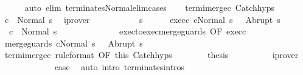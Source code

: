 \begin{isabellebody}
\ \ \ \ \isamarkupfalse%
\ {\isacharparenleft}auto\ elim{\isacharcolon}\ terminates{\isacharunderscore}Normal{\isacharunderscore}elim{\isacharunderscore}cases{\isacharparenright}\isanewline
\ \ \isamarkupfalse%
\ termi{\isacharunderscore}merge{\isacharunderscore}c{}\ Catch{\isachardot}hyps\isanewline
\ \ \isamarkupfalse%
\ {\isachardoublequoteopen}{\isasymGamma}{\isasymturnstile}c{}\ {\isasymdown}\ Normal\ s{\isachardoublequoteclose}\ \isamarkupfalse%
\ iprover\isanewline
\ \ \isamarkupfalse%
\isanewline
\ \ \isacommand{{\isacharbraceleft}}\isamarkupfalse%
\isanewline
\ \ \ \ \isamarkupfalse%
\ s{\isacharprime}\isanewline
\ \ \ \ \isamarkupfalse%
\ exec{\isacharunderscore}c{}{\isacharcolon}\ {\isachardoublequoteopen}{\isasymGamma}{\isasymturnstile}{\isasymlangle}c{}{\isacharcomma}Normal\ s\ {\isasymrangle}\ {\isasymRightarrow}\ Abrupt\ s{\isacharprime}{\isachardoublequoteclose}\isanewline
\ \ \ \ \isamarkupfalse%
\ {\isachardoublequoteopen}{\isasymGamma}{\isasymturnstile}\ c{}\ {\isasymdown}\ Normal\ s{\isacharprime}{\isachardoublequoteclose}\isanewline
\ \ \ \ \isamarkupfalse%
\ {\isacharminus}\isanewline
\ \ \ \ \ \ \isamarkupfalse%
\ exec{\isacharunderscore}to{\isacharunderscore}exec{\isacharunderscore}merge{\isacharunderscore}guards\ {\isacharbrackleft}OF\ exec{\isacharunderscore}c{}{\isacharbrackright}\ \isanewline
\ \ \ \ \ \ \isamarkupfalse%
\ {\isachardoublequoteopen}{\isasymGamma}{\isasymturnstile}{\isasymlangle}merge{\isacharunderscore}guards\ c{}{\isacharcomma}Normal\ s\ {\isasymrangle}\ {\isasymRightarrow}\ Abrupt\ s{\isacharprime}{\isachardoublequoteclose}\ \isacommand{{\isachardot}}\isamarkupfalse%
\isanewline
\ \ \ \ \ \ \isamarkupfalse%
\ termi{\isacharunderscore}merge{\isacharunderscore}c{}\ {\isacharbrackleft}rule{\isacharunderscore}format{\isacharcomma}\ OF\ this{\isacharbrackright}\ Catch{\isachardot}hyps\isanewline
\ \ \ \ \ \ \isamarkupfalse%
\ {\isacharquery}thesis\isanewline
\ \ \ \ \ \ \ \ \isamarkupfalse%
\ iprover\isanewline
\ \ \ \ \isamarkupfalse%
\isanewline
\ \ \isacommand{{\isacharbraceright}}\isamarkupfalse%
\isanewline
\ \ \isamarkupfalse%
\ \isamarkupfalse%
\ {\isacharquery}case\ \isamarkupfalse%
\ {\isacharparenleft}auto\ intro{\isacharcolon}\ terminates{\isachardot}intros{\isacharparenright}\isanewline

\end{isabellebody}
